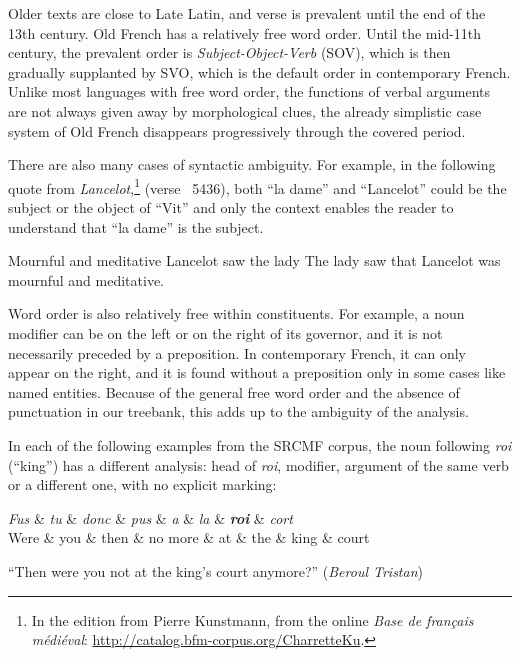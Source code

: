 Older texts are close to Late Latin, and verse is prevalent until the end of the 13th century. Old French has a relatively free word order.
Until the mid-11th century, the prevalent order is \textit{Subject-Object-Verb} (SOV), which is then gradually supplanted by SVO, which is the default order in contemporary French. Unlike most languages with free word order, the functions of verbal arguments are not always given away by morphological clues, the already simplistic case system of Old French disappears progressively through the covered period.

There are also many cases of syntactic ambiguity. For example, in the following quote from \emph{Lancelot},\footnote{In the edition from Pierre Kunstmann, from the online \textit{Base de français médiéval}: \url{http://catalog.bfm-corpus.org/CharretteKu}.} (verse ~5436),
both \enquote{la dame} and \enquote{Lancelot} could be the subject or the object of \enquote{Vit} and only the context enables the reader to understand that \enquote{la dame} is the subject.

{Mournful and meditative Lancelot saw the lady}
{The lady saw that Lancelot was mournful and meditative.}

Word order is also relatively free within constituents. For example, a noun modifier can be on the left or on the right of its governor, and it is not necessarily preceded by a preposition. In contemporary French, it can only appear on the right, and it is found without a preposition only in some cases like named entities. Because of the general free word order and the absence of punctuation in our treebank, this adds up to the ambiguity of the analysis.

In each of the following examples from the SRCMF corpus, the noun following \emph{roi} (\enquote{king}) has a different analysis: head of \emph{roi}, modifier, argument of the same verb or a different one, with no explicit marking:

\begin{center}
    \begin{dependency}[theme=simple]
        \begin{deptext}[row 2/.style={font=\small}]
            \textit{Fus} \& \textit{tu} \& \textit{donc} \& \textit{pus} \& \textit{a} \& \textit{la} \& \textbf{\textit{roi}} \& \textit{cort} \\
            Were \& you \& then \& no more \& at \& the \& king \& court \\
        \end{deptext}
    \end{dependency}

    \raggedright
    \enquote{Then were you not at the king's court anymore?} (\emph{Beroul Tristan})
\end{center}


